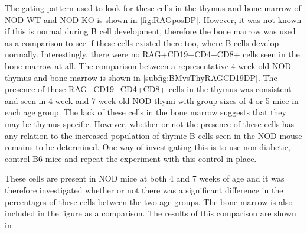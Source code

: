 The gating pattern used to look for these cells in the thymus and bone marrow of NOD WT and NOD KO is shown in \cref{fig:RAGposDP}.
However, it was not known if this is normal during B cell development, therefore the bone marrow was used as a comparison to see if these cells existed there too, where B cells develop normally.
Interestingly, there were no RAG+CD19+CD4+CD8+ cells seen in the bone marrow at all. 
The comparison between a representative 4 week old NOD thymus and bone marrow is shown in \cref{subfig:BMvsThyRAGCD19DP}.
The presence of these RAG+CD19+CD4+CD8+ cells in the thymus was consistent and seen in 4 week and 7 week old NOD thymi with group sizes of 4 or 5 mice in each age group. 
The lack of these cells in the bone marrow suggests that they may be thymus-specific.
However, whether or not the presence of these cells has any relation to the increased population of thymic B cells seen in the NOD mouse remains to be determined.
One way of investigating this is to use non diabetic, control B6 mice and repeat the experiment with this control in place.


These cells are present in NOD mice at both 4 and 7 weeks of age and it was therefore investigated whether or not there was a significant difference in the percentages of these cells between the two age groups. 
The bone marrow is also included in the figure as a comparison.
The results of this comparison are shown in 


